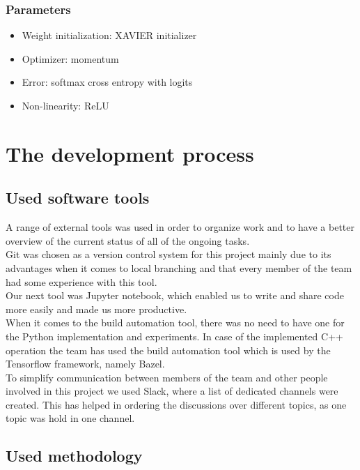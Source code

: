 \documentclass[licencjacka]{pracamgr}
\begin{document}
		\subsection{Parameters}
			\begin{itemize}
 			\item Weight initialization: XAVIER initializer
 			\item Optimizer: momentum 
 			\item Error: softmax cross entropy with logits
 			\item Non-linearity: ReLU
			\end{itemize}

\chapter{The development process}

	\section{Used software tools}
	A range of external tools was used in order to organize work and to have a better overview of the current status of all of the ongoing tasks.
\\
	Git was chosen as a version control system for this project mainly due to its advantages when it comes to local branching and that every member of the team had some experience with this tool.
\\
	Our next tool was Jupyter notebook, which enabled us to write and share code more easily and made us more productive. 
\\
	When it comes to the build automation tool, there was no need to have one for the Python implementation and experiments. In case of the implemented C++ operation the team has used the build automation tool which is used by the Tensorflow framework, namely Bazel.	
\\
	To simplify communication between members of the team and other people involved in this project we used Slack, where a list of dedicated channels were created. This has helped in ordering the discussions over different topics, as one topic was hold in one channel.

	\section{Used methodology}
\end{document}
